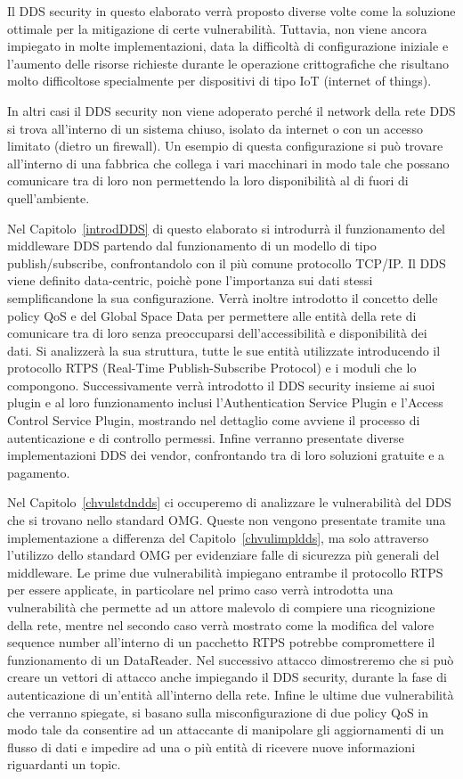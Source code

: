 Il DDS security in questo elaborato verrà proposto diverse volte 
come la soluzione ottimale per la mitigazione di certe vulnerabilità. 
Tuttavia, non viene ancora impiegato in molte implementazioni, 
data la difficoltà di configurazione iniziale e l'aumento 
delle risorse richieste durante le operazione crittografiche che 
risultano molto difficoltose specialmente 
per dispositivi di tipo IoT (internet of things).

In altri casi il DDS security non viene adoperato perché il 
network della rete DDS si trova all'interno di un sistema 
chiuso, isolato da internet o con un accesso limitato 
(dietro un firewall). Un esempio di questa configurazione 
si può trovare all'interno di una fabbrica che collega i vari 
macchinari in modo tale che possano comunicare tra di loro
non permettendo la loro disponibilità al di fuori di 
quell'ambiente.

Nel Capitolo~\ref{introdDDS} di questo elaborato si introdurrà il 
funzionamento del middleware DDS partendo dal funzionamento 
di un modello di tipo publish/subscribe, confrontandolo 
con il più comune protocollo TCP/IP. Il DDS viene definito 
data-centric, poichè pone l'importanza sui dati stessi semplificandone
la sua configurazione. Verrà inoltre introdotto il concetto 
delle policy QoS e del Global Space Data per permettere 
alle entità della rete di comunicare tra di loro senza preoccuparsi 
dell'accessibilità e disponibilità dei dati. Si analizzerà la sua
struttura, tutte le sue entità utilizzate introducendo il protocollo 
RTPS (Real-Time Publish-Subscribe Protocol) e i moduli che lo compongono.
Successivamente verrà introdotto il DDS security insieme ai suoi 
plugin e al loro funzionamento inclusi l'Authentication Service Plugin e 
l'Access Control Service Plugin, mostrando nel dettaglio come 
avviene il processo di autenticazione e di controllo permessi.
Infine verranno presentate diverse implementazioni DDS dei vendor, 
confrontando tra di loro soluzioni gratuite e a pagamento.

Nel Capitolo~\ref{chvulstdndds} ci occuperemo di analizzare 
le vulnerabilità del DDS che si trovano nello standard OMG. 
Queste non vengono presentate tramite una implementazione 
a differenza del Capitolo~\ref{chvulimpldds}, ma solo attraverso 
l'utilizzo dello standard OMG per evidenziare falle 
di sicurezza più generali del middleware. Le prime due vulnerabilità 
impiegano entrambe il protocollo RTPS per essere applicate, 
in particolare nel primo caso verrà introdotta una vulnerabilità 
che permette ad un attore malevolo di compiere una ricognizione 
della rete, mentre nel secondo caso verrà mostrato come la modifica del 
valore sequence number all'interno di un pacchetto RTPS potrebbe
compromettere
il funzionamento di un DataReader. 
Nel successivo attacco dimostreremo che si può creare un vettori 
di attacco anche impiegando il DDS security, durante
la fase di autenticazione di un'entità all'interno della rete.
Infine le ultime due vulnerabilità che verranno spiegate, si basano sulla 
misconfigurazione di due policy QoS in modo tale da consentire ad un
attaccante di manipolare gli aggiornamenti di un flusso di dati e 
impedire ad una o più entità di ricevere nuove informazioni riguardanti 
un topic.

